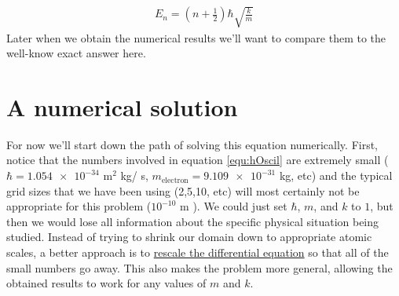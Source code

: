 \begin{align}
E_n = (n + \frac{1}{2}) \hbar \sqrt{\frac{k}{m}}\label{equ:eigenenergies}
\end{align}
 Later when we obtain the numerical results we'll want to compare them
 to the well-know exact answer here.

\section{A numerical solution}
 For now we'll start down the path of solving this equation
 numerically.  First, notice that the numbers involved in equation
 \eqref{equ:hOscil} are extremely small ($\hbar = \num{1.054e-34}$
 m$^2$ kg/ s, $m_\mathrm{electron} = \num{9.109e-31} $ kg, etc) and
 the typical grid sizes that we have been using (2,5,10, etc) will most certainly
 not be appropriate for this problem ($10^{-10} $ m ).  We could just set $\hbar$, $m$,
 and $k$ to $1$, but then we would lose all information about the
 specific physical situation being studied.  Instead of trying to
 shrink our domain down to appropriate atomic scales, a better
 approach is to \underline{rescale the differential equation} so that all of the
 small numbers go away.  This also makes the problem more general,
 allowing the obtained results to work for any values of $m$ and
 $k$. 

